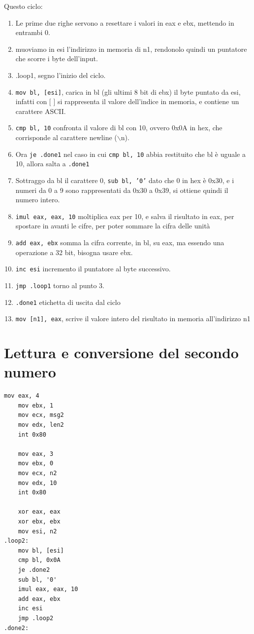 \documentclass[a4paper,12pt]{article}
\begin{document}
	Questo ciclo:
\begin{enumerate}
	\item Le prime due righe servono a resettare i valori in eax e ebx, mettendo in entrambi 0.
	\item muoviamo in esi l'indirizzo in memoria di n1, rendonolo quindi un puntatore che scorre i byte dell'input.
	\item .loop1, segno l'inizio del ciclo.
	\item \texttt{mov bl, [esi]}, carica in bl (gli ultimi 8 bit di ebx) il byte puntato da esi, infatti con [  ] si rappresenta il valore dell'indice in memoria, e contiene un carattere ASCII.
	\item \texttt{cmp bl, 10} confronta il valore di bl con 10, ovvero 0x0A in hex, che corrisponde al carattere newline ($\backslash$n).
	\item Ora \texttt{je .done1} nel caso in cui \texttt{cmp bl, 10} abbia restituito che bl è uguale a 10, allora salta a \texttt{.done1}
	\item Sottraggo da bl il carattere 0, \texttt{sub bl, '0'} dato che 0 in hex è 0x30, e i numeri da 0 a 9 sono rappresentati da 0x30 a 0x39, si ottiene quindi il numero intero.
	\item \texttt{imul eax, eax, 10} moltiplica eax per 10, e salva il risultato in eax, per spostare in avanti le cifre, per poter sommare la cifra delle unità
	\item \texttt{add eax, ebx} somma la cifra corrente, in bl, su eax, ma essendo una operazione a 32 bit, bisogna usare ebx.
	\item \texttt{inc esi} incremento il puntatore al byte successivo.
	\item \texttt{jmp .loop1} torno al punto 3.
	\item \texttt{.done1} etichetta di uscita dal ciclo 
	\item \texttt{mov [n1], eax}, scrive il valore intero del risultato in memoria all'indirizzo n1
\end{enumerate}
	
	\section*{Lettura e conversione del secondo numero}
	\begin{lstlisting}[language={[x86masm]Assembler}]
	mov eax, 4
	mov ebx, 1
	mov ecx, msg2
	mov edx, len2
	int 0x80
	
	mov eax, 3
	mov ebx, 0
	mov ecx, n2
	mov edx, 10
	int 0x80
	
	xor eax, eax
	xor ebx, ebx
	mov esi, n2
.loop2:
	mov bl, [esi]
	cmp bl, 0x0A
	je .done2
	sub bl, '0'
	imul eax, eax, 10
	add eax, ebx
	inc esi
	jmp .loop2
.done2:
	\end{lstlisting}
	
\end{document}
